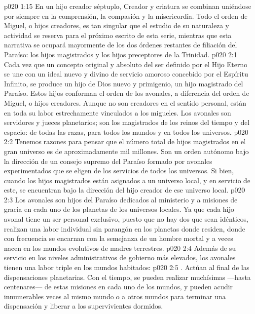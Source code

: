\vs p020 1:15 En un hijo creador séptuplo, Creador y criatura se combinan uniéndose por siempre en la comprensión, la compasión y la misericordia. Todo el orden de Miguel, o hijos creadores, es tan singular que el estudio de su naturaleza y actividad se reserva para el próximo escrito de esta serie, mientras que esta narrativa se ocupará mayormente de los dos órdenes restantes de filiación del Paraíso: los hijos magistrados y los hijos preceptores de la Trinidad.
\vs p020 2:1 Cada vez que un concepto original y absoluto del ser definido por el Hijo Eterno se une con un ideal nuevo y divino de servicio amoroso concebido por el Espíritu Infinito, se produce un hijo de Dios nuevo y primigenio, un hijo magistrado del Paraíso. Estos hijos conforman el orden de los avonales, a diferencia del orden de Miguel, o hijos creadores. Aunque no son creadores en el sentido personal, están en toda su labor estrechamente vinculados a los migueles. Los avonales son servidores y jueces planetarios; son los magistrados de los reinos del tiempo y del espacio: de todas las razas, para todos los mundos y en todos los universos.
\vs p020 2:2 Tenemos razones para pensar que el número total de hijos magistrados en el gran universo es de aproximadamente mil millones. Son un orden autónomo bajo la dirección de un consejo supremo del Paraíso formado por avonales experimentados que se eligen de los servicios de todos los universos. Si bien, cuando los hijos magistrados están asignados a un universo local, y en servicio de este, se encuentran bajo la dirección del hijo creador de ese universo local.
\vs p020 2:3 Los avonales son hijos del Paraíso dedicados al ministerio y a misiones de gracia en cada uno de los planetas de los universos locales. Ya que cada hijo avonal tiene un ser personal exclusivo, puesto que no hay dos que sean idénticos, realizan una labor individual sin parangón en los planetas donde residen, donde con frecuencia se encarnan con la semejanza de un hombre mortal y a veces nacen en los mundos evolutivos de madres terrestres.
\vs p020 2:4 \pc Además de su servicio en los niveles administrativos de gobierno más elevados, los avonales tienen una labor triple en los mundos habitados:
\vs p020 2:5 . Actúan al final de las dispensaciones planetarias. Con el tiempo, se pueden realizar muchísimas ---hasta centenares--- de estas misiones en cada uno de los mundos, y pueden acudir innumerables veces al mismo mundo o a otros mundos para terminar una dispensación y liberar a los supervivientes dormidos.
